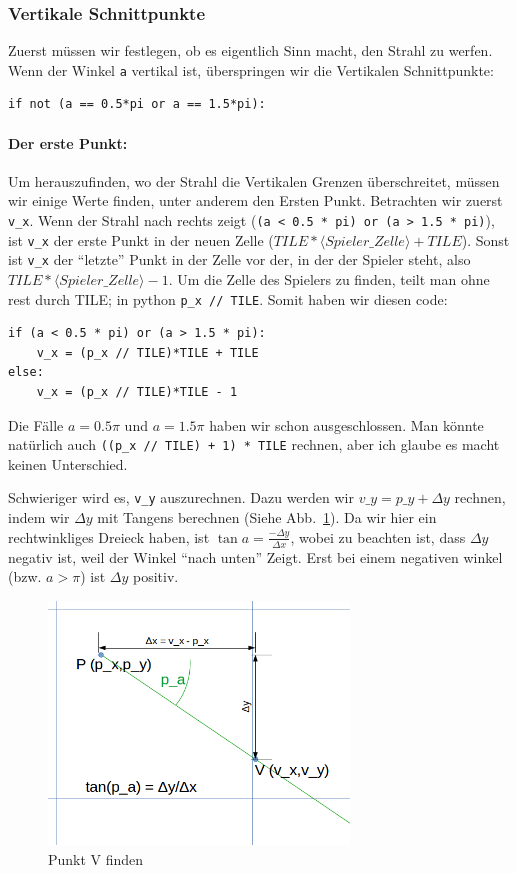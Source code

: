\documentclass[a4paper,12pt]{report}
\begin{document}
\subsubsection{Vertikale Schnittpunkte}
Zuerst müssen wir festlegen, ob es eigentlich Sinn macht, den Strahl zu werfen. Wenn der Winkel \texttt{a} vertikal ist, überspringen wir die Vertikalen Schnittpunkte:
\begin{Verbatim}[baselinestretch=1.0, xleftmargin=1cm]
if not (a == 0.5*pi or a == 1.5*pi):
\end{Verbatim}

\paragraph{Der erste Punkt:}
Um herauszufinden, wo der Strahl die Vertikalen Grenzen überschreitet, müssen wir einige Werte finden, unter anderem den Ersten Punkt. Betrachten wir zuerst \texttt{v\_x}. Wenn der Strahl nach rechts zeigt (\texttt{(a < 0.5 * pi) or (a > 1.5 * pi)}), ist \texttt{v\_x} der erste Punkt in der neuen Zelle ($TILE*\langle Spieler\_Zelle\rangle + TILE$). Sonst ist \texttt{v\_x} der ``letzte'' Punkt in der Zelle vor der, in der der Spieler steht, also $TILE*\langle Spieler\_Zelle\rangle - 1$. Um die Zelle des Spielers zu finden, teilt man ohne rest durch TILE; in python \texttt{p\_x // TILE}. Somit haben wir diesen code:
\begin{Verbatim}[baselinestretch=1.0, xleftmargin=1cm]
if (a < 0.5 * pi) or (a > 1.5 * pi):
	v_x = (p_x // TILE)*TILE + TILE
else:
	v_x = (p_x // TILE)*TILE - 1
\end{Verbatim}

Die Fälle $a = 0.5\pi$ und $a = 1.5\pi$ haben wir schon ausgeschlossen. Man könnte natürlich auch \texttt{((p\_x // TILE) + 1) * TILE} rechnen, aber ich glaube es macht keinen Unterschied.

Schwieriger wird es, \texttt{v\_y} auszurechnen. Dazu werden wir $v\_y = p\_y + \Delta y$ rechnen, indem wir $\Delta y$ mit Tangens berechnen (Siehe Abb.~\ref{fig:vcheck1}). Da wir hier ein rechtwinkliges Dreieck haben, ist $\tan a = \frac{-\Delta y}{\Delta x}$, wobei zu beachten ist, dass $\Delta y$ negativ ist, weil der Winkel ``nach unten'' Zeigt.
Erst bei einem negativen winkel (bzw. $a > \pi$) ist $\Delta y$ positiv.

\begin{figure}[htbp] 
        \centering
        \includegraphics[width=8cm]{vcheck1.png} 
        \caption{Punkt V finden}
        \label{fig:vcheck1}
\end{figure}
\end{document}
